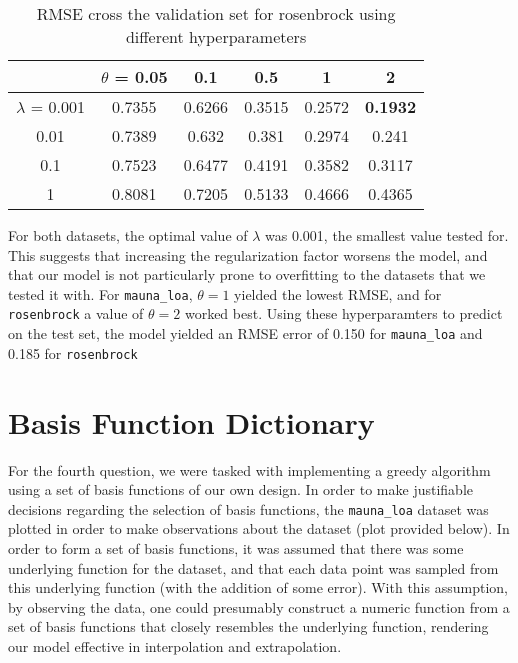 \documentclass{article}
\begin{document}
\begin{table}
\begin{center}
\begin{tabular}{|c|c|c|c|c|c|}
\hline
 & $\theta$ = 0.05 & 0.1 & 0.5 & 1 & 2 \\ \hline
 $\lambda$ = 0.001  & 0.7355 & 0.6266 & 0.3515 & 0.2572 & \textbf{0.1932}\\ \hline
 0.01 & 0.7389 & 0.632 & 0.381 & 0.2974 & 0.241\\ \hline
 0.1 & 0.7523 & 0.6477 & 0.4191 & 0.3582 & 0.3117\\ \hline
 1 & 0.8081 & 0.7205 & 0.5133 & 0.4666 & 0.4365\\
 \hline
\end{tabular}
\caption{RMSE cross the validation set for rosenbrock using different hyperparameters}
\end{center}
\end{table}

For both datasets, the optimal value of $\lambda$ was 0.001, the smallest value tested for. This suggests that increasing the regularization factor worsens the model, and that our model is not particularly prone to overfitting to the datasets that we tested it with. For \verb+mauna_loa+, $\theta = 1$ yielded the lowest RMSE, and for \verb+rosenbrock+ a value of $\theta = 2$ worked best. Using these hyperparamters to predict on the test set, the model yielded an RMSE error of 0.150 for \verb+mauna_loa+ and 0.185 for \verb+rosenbrock+


\pagebreak
\fi
\section{Basis Function Dictionary}
For the fourth question, we were tasked with implementing a greedy algorithm using a set of basis functions of our own design. In order to make justifiable decisions regarding the selection of basis functions, the \verb+mauna_loa+ dataset was plotted in order to make observations about the dataset (plot provided below). In order to form a set of basis functions, it was assumed that there was some underlying function for the dataset, and that each data point was sampled from this underlying function (with the addition of some error). With this assumption, by observing the data, one could presumably construct a numeric function from a set of basis functions that closely resembles the underlying function, rendering our model effective in interpolation and extrapolation.

\end{document}
